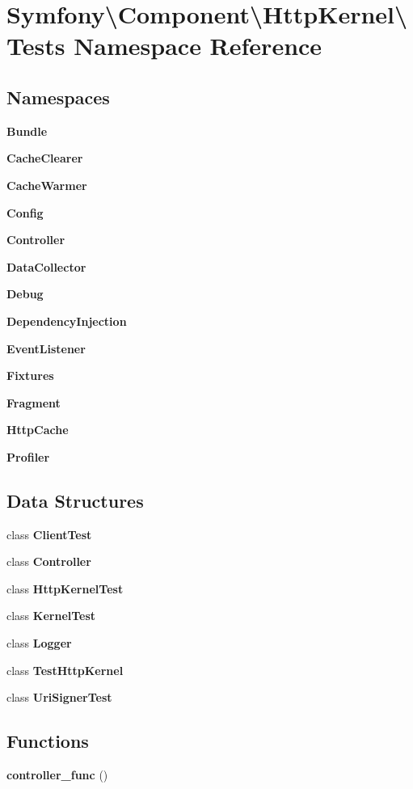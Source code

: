 \section{Symfony\textbackslash{}Component\textbackslash{}Http\+Kernel\textbackslash{}Tests Namespace Reference}
\label{namespace_symfony_1_1_component_1_1_http_kernel_1_1_tests}
\subsection*{Namespaces}
\begin{DoxyCompactItemize}
\item 
 {\bf Bundle}
\item 
 {\bf Cache\+Clearer}
\item 
 {\bf Cache\+Warmer}
\item 
 {\bf Config}
\item 
 {\bf Controller}
\item 
 {\bf Data\+Collector}
\item 
 {\bf Debug}
\item 
 {\bf Dependency\+Injection}
\item 
 {\bf Event\+Listener}
\item 
 {\bf Fixtures}
\item 
 {\bf Fragment}
\item 
 {\bf Http\+Cache}
\item 
 {\bf Profiler}
\end{DoxyCompactItemize}
\subsection*{Data Structures}
\begin{DoxyCompactItemize}
\item 
class {\bf Client\+Test}
\item 
class {\bf Controller}
\item 
class {\bf Http\+Kernel\+Test}
\item 
class {\bf Kernel\+Test}
\item 
class {\bf Logger}
\item 
class {\bf Test\+Http\+Kernel}
\item 
class {\bf Uri\+Signer\+Test}
\end{DoxyCompactItemize}
\subsection*{Functions}
\begin{DoxyCompactItemize}
\item 
{\bf controller\+\_\+func} ()
\end{DoxyCompactItemize}


